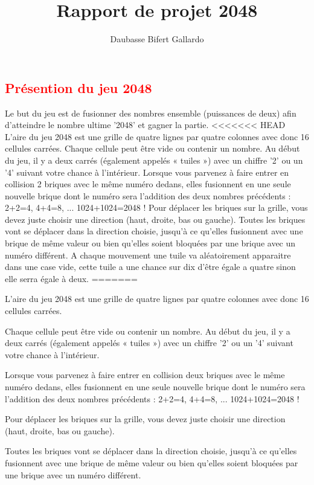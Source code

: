 \documentclass{article}
\title{Rapport de projet 2048}
\author{Daubasse Bifert Gallardo}
\begin{document}
\maketitle
\tableofcontents
\textcolor{red}{\section{Présention du jeu 2048}}
Le but du jeu est de fusionner des nombres ensemble (puissances de deux) afin d'atteindre le nombre ultime '2048' et gagner la partie.
<<<<<<< HEAD
L'aire du jeu 2048 est une grille de quatre lignes par quatre colonnes avec donc 16 cellules carrées. Chaque cellule peut être vide ou contenir un nombre. Au début du jeu, il y a deux carrés (également appelés « tuiles ») avec un chiffre '2' ou un '4' suivant votre chance à l'intérieur.
Lorsque vous parvenez à faire entrer en collision 2 briques avec le même numéro dedans, elles fusionnent en une seule nouvelle brique dont le numéro sera l'addition des deux nombres précédents : 2+2=4, 4+4=8, ... 1024+1024=2048 !
Pour déplacer les briques sur la grille, vous devez juste choisir une direction (haut, droite, bas ou gauche). Toutes les briques vont se déplacer dans la direction choisie, jusqu'à ce qu'elles fusionnent avec une brique de même valeur ou bien qu'elles soient bloquées par une brique avec un numéro différent. A chaque mouvement une tuile va aléatoirement apparaitre dans une case vide, cette tuile a une chance sur dix d'être égale a quatre sinon elle serra égale à deux.
=======

L'aire du jeu 2048 est une grille de quatre lignes par quatre colonnes avec donc 16 cellules carrées.

Chaque cellule peut être vide ou contenir un nombre. Au début du jeu, il y a deux carrés (également appelés « tuiles ») avec un chiffre '2' ou un '4' suivant votre chance à l'intérieur. 

Lorsque vous parvenez à faire entrer en collision deux briques avec le même numéro dedans, elles fusionnent en une seule nouvelle brique dont le numéro sera l'addition des deux nombres précédents : 2+2=4, 4+4=8, ... 1024+1024=2048 !

Pour déplacer les briques sur la grille, vous devez juste choisir une direction (haut, droite, bas ou gauche).

Toutes les briques vont se déplacer dans la direction choisie, jusqu'à ce qu'elles fusionnent avec une brique de même valeur ou bien qu'elles soient bloquées par une brique avec un numéro différent.
\end{document}
